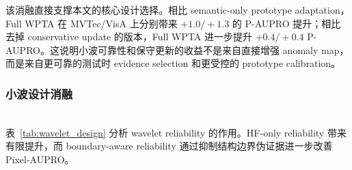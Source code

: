 \documentclass[runningheads]{llncs}
\begin{document}
\begin{table}[htbp]
  \centering
  \caption{MVTec 和 VisA 上的核心组件消融。每个单元格报告 (P-AUROC, P-AUPRO) / (I-AUROC, I-AP)。}
  \label{tab:core_ablation}
\end{table}

该消融直接支撑本文的核心设计选择。相比 semantic-only prototype adaptation，Full WPTA 在 MVTec/VisA 上分别带来 $+1.0/+1.3$ 的 P-AUPRO 提升；相比去掉 conservative update 的版本，Full WPTA 进一步提升 $+0.4/+0.4$ P-AUPRO。这说明小波可靠性和保守更新的收益不是来自直接增强 anomaly map，而是来自更可靠的测试时 evidence selection 和更受控的 prototype calibration。

\subsubsection{小波设计消融}
\mbox{}\\
\noindent
表~\ref{tab:wavelet_design} 分析 wavelet reliability 的作用。HF-only reliability 带来有限提升，而 boundary-aware reliability 通过抑制结构边界伪证据进一步改善 Pixel-AUPRO。
\end{document}
